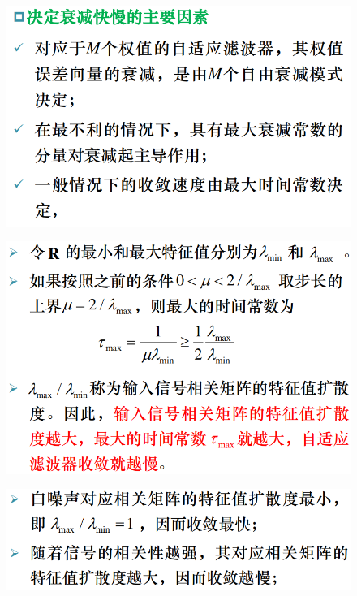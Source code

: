 \documentclass[UTF8]{ctexart} %
\begin{document}
			\begin{figure}[H]
				\centering\includegraphics[scale=0.4]{48.png}
			\end{figure}
			\begin{figure}[H]
				\centering\includegraphics[scale=0.4]{49.png}
			\end{figure}
			\begin{figure}[H]
				\centering\includegraphics[scale=0.4]{50.png}
			\end{figure}
			
\end{document}
